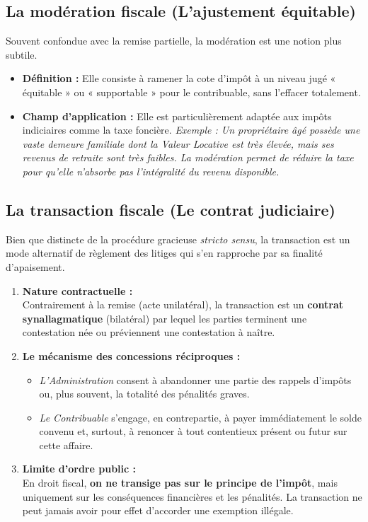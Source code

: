 \documentclass[Cours_contentieuxTF2026.tex]{subfiles}
\begin{document}
\subsection{La modération fiscale (L'ajustement équitable)}

Souvent confondue avec la remise partielle, la modération est une notion plus subtile.

\begin{itemize}
	\item \textbf{Définition :} Elle consiste à ramener la cote d'impôt à un niveau jugé « équitable » ou « supportable » pour le contribuable, sans l'effacer totalement.
	\item \textbf{Champ d'application :} Elle est particulièrement adaptée aux impôts indiciaires comme la taxe foncière.
	\textit{Exemple : Un propriétaire âgé possède une vaste demeure familiale dont la Valeur Locative est très élevée, mais ses revenus de retraite sont très faibles. La modération permet de réduire la taxe pour qu'elle n'absorbe pas l'intégralité du revenu disponible.}
\end{itemize}

\subsection{La transaction fiscale (Le contrat judiciaire)}

Bien que distincte de la procédure gracieuse \textit{stricto sensu}, la transaction est un mode alternatif de règlement des litiges qui s'en rapproche par sa finalité d'apaisement.

\begin{enumerate}
	\item \textbf{Nature contractuelle :} \\
	Contrairement à la remise (acte unilatéral), la transaction est un \textbf{contrat synallagmatique} (bilatéral) par lequel les parties terminent une contestation née ou préviennent une contestation à naître.
	
	\item \textbf{Le mécanisme des concessions réciproques :} \\
	\begin{itemize}
		\item \textit{L'Administration} consent à abandonner une partie des rappels d'impôts ou, plus souvent, la totalité des pénalités graves.
		\item \textit{Le Contribuable} s'engage, en contrepartie, à payer immédiatement le solde convenu et, surtout, à renoncer à tout contentieux présent ou futur sur cette affaire.
	\end{itemize}
	
	\item \textbf{Limite d'ordre public :} \\
	En droit fiscal, \textbf{on ne transige pas sur le principe de l'impôt}, mais uniquement sur les conséquences financières et les pénalités. La transaction ne peut jamais avoir pour effet d'accorder une exemption illégale.
\end{enumerate}	
	
\end{document}

